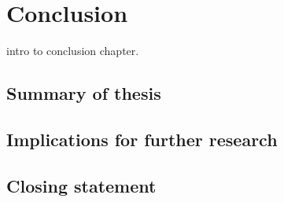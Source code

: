 \documentclass[../main.tex]{subfiles}
\begin{document}
\chapter{Conclusion}
intro to conclusion chapter.

\section{Summary of thesis}

\section{Implications for further research}

\section{Closing statement}
\end{document}
